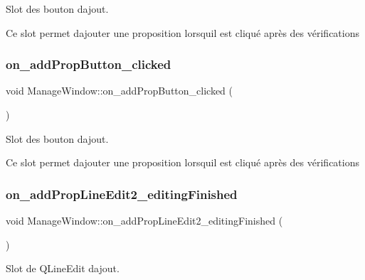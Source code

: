 Slot des bouton d\textquotesingle{}ajout. 

Ce slot permet d\textquotesingle{}ajouter une proposition lorsqu\textquotesingle{}il est cliqué après des vérifications \mbox{\label{classManageWindow_a28475c18e491f3e388747685731e5111}} 
\subsubsection{\texorpdfstring{on\+\_\+add\+Prop\+Button\+\_\+clicked}{on\_addPropButton\_clicked}}
{\footnotesize\ttfamily void Manage\+Window\+::on\+\_\+add\+Prop\+Button\+\_\+clicked (\begin{DoxyParamCaption}{ }\end{DoxyParamCaption})\hspace{0.3cm}{\ttfamily [slot]}}



Slot des bouton d\textquotesingle{}ajout. 

Ce slot permet d\textquotesingle{}ajouter une proposition lorsqu\textquotesingle{}il est cliqué après des vérifications \mbox{\label{classManageWindow_ac66c5947e1a7e97e82b860471f185fa1}} 
\subsubsection{\texorpdfstring{on\+\_\+add\+Prop\+Line\+Edit2\+\_\+editing\+Finished}{on\_addPropLineEdit2\_editingFinished}}
{\footnotesize\ttfamily void Manage\+Window\+::on\+\_\+add\+Prop\+Line\+Edit2\+\_\+editing\+Finished (\begin{DoxyParamCaption}{ }\end{DoxyParamCaption})\hspace{0.3cm}{\ttfamily [slot]}}



Slot de Q\+Line\+Edit d\textquotesingle{}ajout. 

